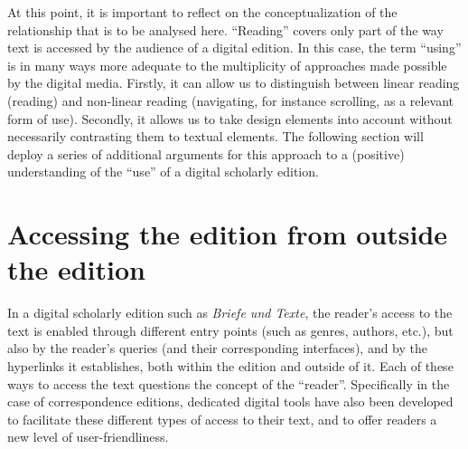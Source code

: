 \begin{paper}
At this point, it is important to reflect on the conceptualization of the
relationship that is to be analysed here. ``Reading'' covers only part
of the way text is accessed by the audience of a digital edition. In
this case, the term ``using'' is in many ways more adequate to the
multiplicity of approaches made possible by the digital media. Firstly, it
can allow us to distinguish between linear reading (reading) and non-linear
reading (navigating, for instance scrolling, as a relevant form of use).
Secondly, it allows us to take design elements into account without necessarily
contrasting them to textual elements. The following section will deploy
a series of additional arguments for this approach to a (positive)
understanding of the ``use'' of a digital scholarly edition.

\section{Accessing the edition from outside the edition}

In a digital scholarly edition such as \emph{Briefe und Texte}, the reader's access to the
text is enabled through different entry points (such as genres, authors, etc.),
but also by the reader's queries (and their corresponding interfaces), and by the hyperlinks it establishes, both within the
edition and outside of it. Each of these ways to access the text
questions the concept of the ``reader''. Specifically in the case of correspondence editions,
dedicated digital tools have also been developed to facilitate these
different types of access to their text, and to offer readers a new level of
user-friendliness.


\end{paper}
